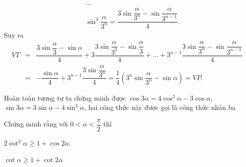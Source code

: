 \begin{vd}
{\begin{enumerate}
\begin{eqnarray*}
				&& \ldots \\
				&& \sin^3\dfrac{\alpha }{3^n}=\dfrac{3\sin \dfrac{\alpha }{3^n}-\sin \dfrac{\alpha }{3^{n-1}}}{4}.
			\end{eqnarray*}
			Suy ra 
			\begin{eqnarray*}
				VT &=& \dfrac{3\sin \dfrac{\alpha }{3}-\sin \alpha }{4}+3\dfrac{3\sin \dfrac{\alpha }{3^2}-\sin \dfrac{\alpha }{3}}{4}+\ldots+3^{n-1}\dfrac{3\sin \dfrac{\alpha }{3^n}-\sin \dfrac{\alpha }{3^{n-1}}}{4}\\
				&=& -\dfrac{\sin \alpha }{4}+3^{n-1}\dfrac{3\sin \dfrac{\alpha }{3^n}}{4}=\dfrac{1}{4}\left( 3^n\sin \dfrac{\alpha }{3^n}-\sin \alpha \right)=VP.
			\end{eqnarray*}
		\end{enumerate}
		\begin{luuy}
			Hoàn toàn tương tự ta chứng minh được $\cos 3\alpha =4\cos^3\alpha -3\cos \alpha$, $\sin 3\alpha =3\sin \alpha -4\sin^3\alpha$, hai công thức này được gọi là công thức nhân ba
		\end{luuy}
	}
\end{vd}

\begin{vd}%
	Chứng minh rằng với $0<\alpha <\dfrac{\pi }{2}$ thì
	\begin{listEX}[2]
		\item $2\cot^2\alpha \ge 1+\cos 2\alpha$.  
		\item $\cot \alpha \ge 1+\cot 2\alpha$
	\end{listEX}
\end{vd}


